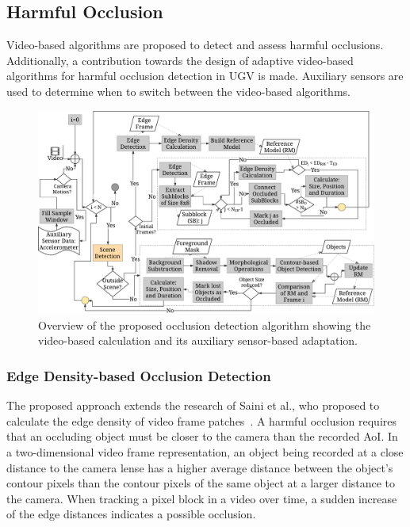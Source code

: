\subsection{Harmful Occlusion}
\label{sec:554_QA_Harmful_Occlusion}
Video-based algorithms are proposed to detect and assess harmful occlusions.
Additionally, a contribution towards the design of adaptive video-based algorithms for harmful occlusion detection in \ac{UGV} is made.
Auxiliary sensors are used to determine when to switch between the video-based algorithms.
\begin{figure}[!htb]
	\centering
	\includegraphics[width=\linewidth]{./gfx/550_QA/Occlusion_Algo}
	\caption[Video-based harmful occlusion detection algorithm]{Overview of the proposed occlusion detection algorithm showing the video-based calculation and its auxiliary sensor-based adaptation.}
	\label{fig:554_Occlusion}
\end{figure}
\subsubsection{Edge Density-based Occlusion Detection}
The proposed approach extends the research of Saini et al., who proposed to calculate the edge density of video frame patches~\cite{Saini2012}.
A harmful occlusion requires that an occluding object must be closer to the camera than the recorded \ac{AoI}.
In a two-dimensional video frame representation, an object being recorded at a close distance to the camera lense has a higher average distance between the object's contour pixels than the contour pixels of the same object at a larger distance to the camera.
When tracking a pixel block in a video over time, a sudden increase of the edge distances indicates a possible occlusion.

